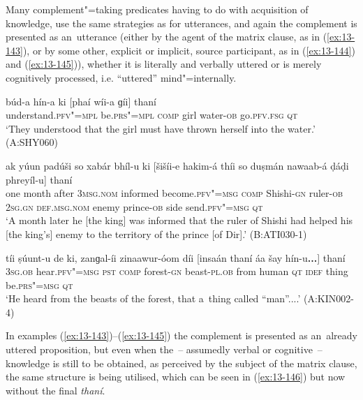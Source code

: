  Many complement"=taking predicates having to do with acquisition of knowledge, use the same strategies as for utterances, and again the complement is presented as an~utterance (either by the agent of the matrix clause, as in (\ref{ex:13-143}), or by some other, explicit or implicit, source participant, as in (\ref{ex:13-144}) and (\ref{ex:13-145})), whether it is literally and verbally uttered or is merely cognitively processed, i.e. ``uttered'' mind"=internally. 

\begin{exe}
\ex
\label{ex:13-143}
\gll \label{bkm:Ref190835538}búd-a hín-a ki [phaí wíi-a  ɡíi] thaní \\
understand.\textsc{pfv"=mpl} be.\textsc{prs"=mpl} \textsc{comp} girl water-\textsc{ob} go.\textsc{pfv.fsg} \textsc{qt} \\
\glt `They understood that the girl must have thrown herself into the water.' (A:SHY060)

\ex
\label{ex:13-144}
\gll ak yúun padúši so xabár bhíl-u  ki [šišíi-e hakim-á thíi so
  duṣmán nawaab-á  ḍáḍi phreyíl-u] thaní \\
one month after \textsc{3msg.nom} informed become.\textsc{pfv"=msg}  \textsc{comp} Shishi-\textsc{gn} ruler-\textsc{ob } \textsc{2sg.gn} \textsc{def.msg.nom} enemy prince-\textsc{ob} side send.\textsc{pfv"=msg} \textsc{qt}  \\
\glt `A month later he [the king] was informed that the ruler of Shishi had helped his [the king's] enemy to the territory of the prince [of Dir].' (B:ATI030-1)

\ex
\label{ex:13-145}
\gll \label{bkm:Ref190835565}tíi ṣúunt-u de ki, zanɡal-íi zinaawur-óom  díi [insaán thaní áa šay hín-u\textbf{...}] thaní \\
\textsc{3sg.ob} hear.\textsc{pfv"=msg} \textsc{pst} \textsc{comp} forest-\textsc{gn} beast-\textsc{pl.ob}  from human \textsc{qt} \textsc{idef} thing be.\textsc{prs"=msg} \textsc{qt} \\
\glt `He heard from the beasts of the forest, that a~thing called ``man''....' (A:KIN002-4) 
\end{exe}

In examples (\ref{ex:13-143})--(\ref{ex:13-145}) the complement is presented as an~already uttered proposition, but even when the~-- assumedly verbal or cognitive~-- knowledge is still to be obtained, as perceived by the subject of the matrix clause, the same structure is being utilised, which can be seen in (\ref{ex:13-146}) but now without the final \textit{thaní}. 

